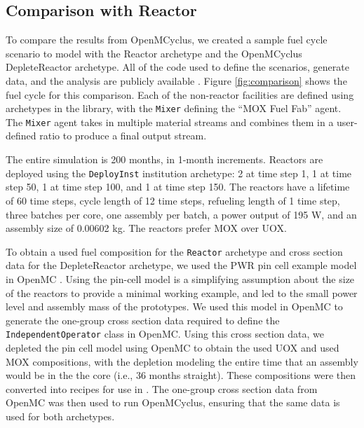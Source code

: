 \subsection{Comparison with \Cycamore Reactor}\label{sec:benchmark}
To compare the results from OpenMCyclus, we created a sample fuel cycle 
scenario to model with the \Cycamore Reactor archetype and the 
OpenMCyclus DepleteReactor archetype. All of the code used to define the 
scenarios, generate data, and the analysis are publicly available 
\cite{bachmann_openmcyclus_2023}. Figure \ref{fig:comparison} 
shows the fuel cycle for this comparison. Each of the non-reactor 
facilities are defined 
using archetypes in the \Cycamore library, with the \Cycamore \texttt{Mixer}
defining the ``MOX Fuel Fab'' agent. The \texttt{Mixer} agent takes in multiple 
material streams and combines them in a user-defined ratio to produce 
a final output stream. 



The entire simulation is 200 months, in 1-month increments. Reactors are 
deployed using the 
\Cycamore \texttt{DeployInst} institution archetype: 2 at time step 1, 
1 at time step 
50, 1 at time step 100, and 1 at time step 150. The reactors have a lifetime 
of 60 time steps, cycle length of 12 time steps, refueling length of 1 
time step, three batches per core, one assembly per batch, a power output of 
195 W, and an assembly size of 0.00602 kg. The reactors prefer MOX over UOX. 
 
To obtain a used fuel composition for the \Cycamore \texttt{Reactor} 
archetype and cross section data for the DepleteReactor archetype, we 
used the \gls{PWR} pin cell example model in OpenMC \cite{noauthor_modeling_nodate}. 
Using the pin-cell model is a simplifying assumption about the size of 
the reactors to provide a minimal working example, 
and led to the small power level and assembly mass of the prototypes. 
We used this model in OpenMC to generate the one-group cross 
section data required to define 
the \texttt{IndependentOperator} class 
in OpenMC. Using this cross section data, we depleted the pin cell 
model using OpenMC to obtain the used \gls{UOX} and 
used \gls{MOX} compositions, with the depletion modeling the entire time that 
an assembly would be in the the core (i.e., 36 months straight). 
These compositions were then converted into recipes for use in 
\Cyclus.
The one-group cross section data from OpenMC was then used to run 
OpenMCyclus, ensuring that the same data is used for both archetypes.  

